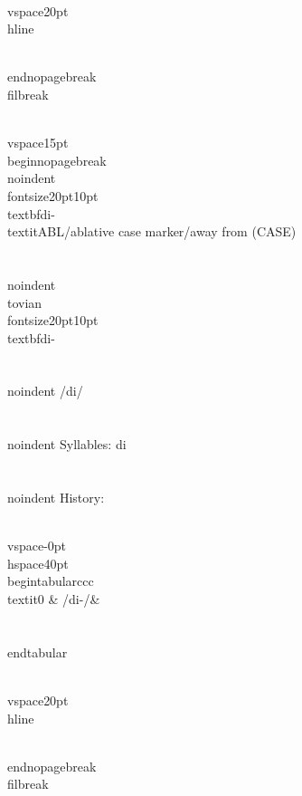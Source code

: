 \\vspace{20pt}\\hline

\\end{nopagebreak}
\\filbreak



\\vspace{15pt}
\\begin{nopagebreak}
\\noindent{\\fontsize{20pt}{10pt}\\textbf{di-} } \\textit{ABL/ablative case marker/away from} (CASE)\\\\
\\noindent {\\tovian \\fontsize{20pt}{10pt} \\textbf{di-} }\\\\
\\noindent /d{\textprimstress}i/\\\\
\\noindent Syllables: di\\\\


\\noindent History:

\\vspace{-0pt}
\\hspace{40pt}
\\begin{tabular}{ccc}
\\textit{0} & /di-/& \\\\
\\end{tabular}

\\vspace{20pt}\\hline

\\end{nopagebreak}
\\filbreak



